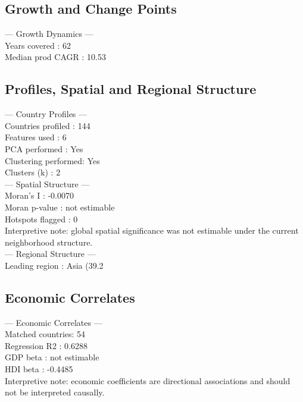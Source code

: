 \subsection*{Growth and Change Points}
--- Growth Dynamics ---\\  Years covered    : 62\\  Median prod CAGR : 10.53%

\subsection*{Profiles, Spatial and Regional Structure}
--- Country Profiles ---\\  Countries profiled  : 144\\  Features used       : 6\\  PCA performed       : Yes\\  Clustering performed: Yes\\  Clusters (k)        : 2\\--- Spatial Structure ---\\  Moran's I        : -0.0070\\  Moran p-value    : not estimable\\  Hotspots flagged : 0\\  Interpretive note: global spatial significance was not estimable under the current neighborhood structure.\\--- Regional Structure ---\\  Leading region   : Asia (39.2%

\subsection*{Economic Correlates}
--- Economic Correlates ---\\  Matched countries: 54\\  Regression R2    : 0.6288\\  GDP beta         : not estimable\\  HDI beta         : -0.4485\\  Interpretive note: economic coefficients are directional associations and should not be interpreted causally.

